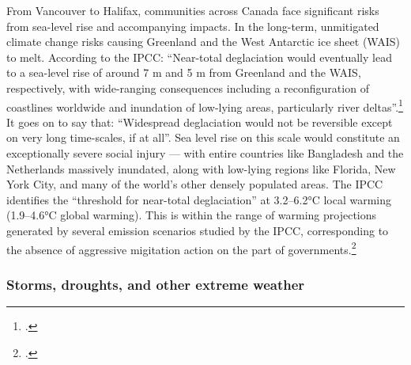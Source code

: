 From Vancouver to Halifax, communities across Canada face significant risks from sea-level rise and accompanying impacts.
In the long-term, unmitigated climate change risks causing Greenland and the West Antarctic ice sheet (WAIS) to melt.
According to the IPCC: ``Near-total deglaciation would eventually lead to a sea-level rise of around 7 m and 5 m from Greenland and the WAIS, respectively, with wide-ranging consequences including a reconfiguration of coastlines worldwide and inundation of low-lying areas, particularly river deltas''.\footcite[][See: "Deglaciation of West Antarctic and Greenland ice sheets" \url{https://www.ipcc.ch/publications_and_data/ar4/wg2/en/ch19s19-3-5-2.html}]{IPCC2007}
It goes on to say that: ``Widespread deglaciation would not be reversible except on very long time-scales, if at all''.
Sea level rise on this scale would constitute an exceptionally severe social injury --- with entire countries like Bangladesh and the Netherlands massively inundated, along with low-lying regions like Florida, New York City, and many of the world's other densely populated areas.
The IPCC identifies the ``threshold for near-total deglaciation'' at 3.2--6.2°C local warming (1.9--4.6°C global warming).
This is within the range of warming projections generated by several emission scenarios studied by the IPCC, corresponding to the absence of aggressive migitation action on the part of governments.\footcite[][See: "Projected climate change an its impacts" \url{https://www.ipcc.ch/publications_and_data/ar4/syr/en/spms3.html}"]{IPCC2007}


	
	\subsubsection{Storms, droughts, and other extreme weather}




